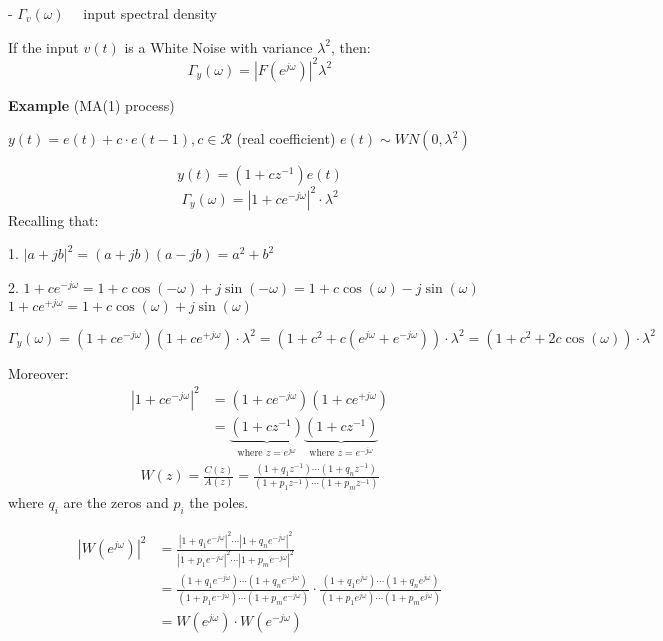 - $\Gamma_{v}(\omega) \quad$ input spectral density

If the input $v(t)$ is a White Noise with variance $\lambda^{2}$, then:
$$
\Gamma_{y}(\omega)=\left|F\left(e^{j \omega}\right)\right|^{2} \lambda^{2}
$$

\textbf{Example} (MA(1) process)

$y(t)=e(t)+c \cdot e(t-1), c \in \mathcal{R}$ (real coefficient)
$e(t)\sim W N(0,\lambda^{2} )$

$$
y(t)=\left(1+c z^{-1}\right) e(t)
$$
$$
\Gamma_{y}(\omega)=\left|1+c e^{-j \omega}\right|^{2} \cdot \lambda^{2}
$$
Recalling that:

1. $|a+j b|^{2}=(a+j b)(a-j b)=a^{2}+b^{2}$

2. $1+c e^{-j \omega}=1+c \cos (-\omega)+j \sin (-\omega)=1+c \cos (\omega)-j \sin (\omega)$ $1+c e^{+j \omega}=1+c \cos (\omega)+j \sin (\omega)$

$$
\Gamma_{y}(\omega)=\left(1+c e^{-j \omega}\right)\left(1+c e^{+j \omega}\right)\cdot \lambda^{2}=(1+c^{2}+c\left(e^{j \omega}+e^{-j \omega}\right))\cdot \lambda^{2}=(1+c^{2}+2 c \cos (\omega))\cdot \lambda^{2}
$$


Moreover:
\begin{align*}
	|1+c e^{-j \omega}|^2&=\left(1+c e^{-j \omega}\right)\left(1+c e^{+j \omega}\right)\\
	&=\underbrace{\left(1+c z^{-1}\right)}_\text{where $z=e^{j \omega}$}\underbrace{\left(1+c z^{-1}\right)}_\text{where $z=e^{-j \omega}$}
\end{align*}
\begin{align*}
	W(z)=\frac{C(z)}{A(z)}=\frac{(1+q_1z^{-1})\cdots(1+q_nz^{-1})}{(1+p_1z^{-1})\cdots(1+p_mz^{-1})}
\end{align*}
where $q_i$ are the zeros and $p_i$ the poles.

\begin{align*}
	\left|W\left(e^{j \omega}\right)\right|^{2}&=\frac{|1+q_1e^{-j \omega}|^2\cdots|1+q_ne^{-j \omega}|^2}{|1+p_1e^{-j \omega}|^2\cdots|1+p_me^{-j \omega}|^2}\\
	&=\frac{(1+q_1e^{-j \omega})\cdots(1+q_ne^{-j \omega})}{(1+p_1e^{-j \omega})\cdots(1+p_me^{-j \omega})}\cdot\frac{(1+q_1e^{j \omega})\cdots(1+q_ne^{j \omega})}{(1+p_1e^{j \omega})\cdots(1+p_me^{j \omega})}\\
			&=W\left(e^{j \omega}\right)\cdot W\left(e^{-j \omega}\right)
\end{align*}